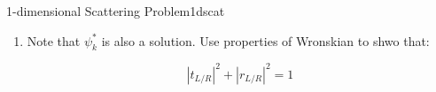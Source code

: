 \begin{mystexercise}{1-dimensional Scattering Problem}{1dscat}
\begin{enumerate}
where $\Pi_L$ depicts a left-incident wave with no incoming wave from the right and $\Pi_R$ is the opposite. Show that the solution(in $L,R$) for the BC $\Pi_1$ and $k>0$ is:

\begin{equation}
\begin{aligned}
\psi_k^L(x) = \begin{cases}
\exp(ikx)+ r_L(k)\exp(-ikx) & x\in L \\
t_L(k)\exp(ikx) & x\in R
\end{cases}
\end{aligned}
\end{equation}


Similarily, for $\Pi_2$, $k<0$:

\begin{equation}
\begin{aligned}
\psi_k^R(x)=\begin{cases}
t_R(k)\exp(ikx)& x\in L \\
\exp(ikx) + r_R(k)\exp(-ikx) & x\in R
\end{cases}
\end{aligned}
\end{equation}


where $t, r$ denotes the \textit{transmission} and \textit{reflection} coefficient.


\item Note that $\psi_k^*$ is also a solution. Use properties of Wronskian to shwo that:

\begin{equation}
|t_{L/R}|^2 + |r_{L/R}|^2=1
\end{equation}
\end{enumerate}

\end{mystexercise}
